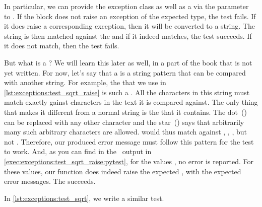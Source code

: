 %
%
%
%
%
%
In particular, we can provide the exception class as well as a  via the parameter~ to .
If the block does not raise an exception of the expected type, the test fails.
If it does raise a corresponding exception, then it will be converted to a string.
The string is then matched against the  and if it indeed matches, the test succeeds.
If it does not match, then the test fails.%
%
\begin{sloppypar}%
But what is a ?
We will learn this later as well, in a part of the book that is not yet written.
For now, let's say that a  is a string pattern that can be compared with another string.
For example, the  that we use in \cref{lst:exceptions:test_sqrt_raise} is such a .
All the  characters in this string must match exactly gainst characters in the text it is compared against.
The only thing that makes it different from a normal string is the  that it contains.
The dot~() can be replaced with any other character and the star~(\textil{*}) says that arbitrarily many such arbitrary characters are allowed.
 would thus match against , , , but not .
Therefore, our produced error message must follow this pattern for the test to work.
And, as you can find in the \pytest\ output in \cref{exec:exceptions:test_sqrt_raise:pytest}, for the values , no error is reported.
For these values, our  function does indeed raise the expected , with the expected error messages.
The  succeeds.%
\end{sloppypar}%
%
In \cref{lst:exceptions:test_sqrt}, we write a similar test.

